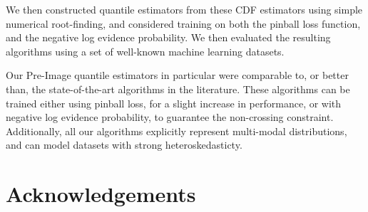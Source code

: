 \documentclass[twoside]{article} \usepackage{aistats2017}
\theoremstyle{definition}
\theoremstyle{theorem}
\begin{document}
	We then constructed quantile estimators from these CDF estimators using simple numerical root-finding, and considered training on both the pinball loss function, and the negative log evidence probability. We then evaluated the resulting algorithms using a set of well-known machine learning datasets.
	
	Our Pre-Image quantile estimators in particular were comparable to, or better than, the state-of-the-art algorithms in the literature. These algorithms can be trained either using pinball loss, for a slight increase in performance, or with negative log evidence probability, to guarantee the non-crossing constraint. Additionally, all our algorithms explicitly represent multi-modal distributions, and can model datasets with strong heteroskedasticty.

\section*{Acknowledgements}



\end{document}
